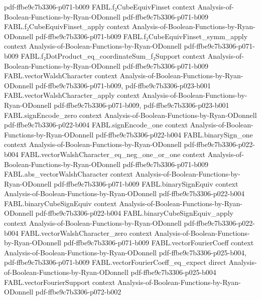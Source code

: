 \begin{theorem}
  {pdf-ffbe9c7b3306-p071-b009}
\proofstep
  {FABL.f₂CubeEquivFinset}
  {context}
  {Analysis-of-Boolean-Functions-by-Ryan-ODonnell}
  {pdf-ffbe9c7b3306-p071-b009}
\proofstep
  {FABL.f₂CubeEquivFinset_apply}
  {context}
  {Analysis-of-Boolean-Functions-by-Ryan-ODonnell}
  {pdf-ffbe9c7b3306-p071-b009}
\proofstep
  {FABL.f₂CubeEquivFinset_symm_apply}
  {context}
  {Analysis-of-Boolean-Functions-by-Ryan-ODonnell}
  {pdf-ffbe9c7b3306-p071-b009}
\proofstep
  {FABL.f₂DotProduct_eq_coordinateSum_f₂Support}
  {context}
  {Analysis-of-Boolean-Functions-by-Ryan-ODonnell}
  {pdf-ffbe9c7b3306-p071-b009}
\proofstep
  {FABL.vectorWalshCharacter}
  {context}
  {Analysis-of-Boolean-Functions-by-Ryan-ODonnell}
  {pdf-ffbe9c7b3306-p071-b009,
    pdf-ffbe9c7b3306-p023-b001}
\proofstep
  {FABL.vectorWalshCharacter_apply}
  {context}
  {Analysis-of-Boolean-Functions-by-Ryan-ODonnell}
  {pdf-ffbe9c7b3306-p071-b009,
    pdf-ffbe9c7b3306-p023-b001}
\proofstep
  {FABL.signEncode_zero}
  {context}
  {Analysis-of-Boolean-Functions-by-Ryan-ODonnell}
  {pdf-ffbe9c7b3306-p022-b004}
\proofstep
  {FABL.signEncode_one}
  {context}
  {Analysis-of-Boolean-Functions-by-Ryan-ODonnell}
  {pdf-ffbe9c7b3306-p022-b004}
\proofstep
  {FABL.binarySign_one}
  {context}
  {Analysis-of-Boolean-Functions-by-Ryan-ODonnell}
  {pdf-ffbe9c7b3306-p022-b004}
\proofstep
  {FABL.vectorWalshCharacter_eq_neg_one_or_one}
  {context}
  {Analysis-of-Boolean-Functions-by-Ryan-ODonnell}
  {pdf-ffbe9c7b3306-p071-b009}
\proofstep
  {FABL.abs_vectorWalshCharacter}
  {context}
  {Analysis-of-Boolean-Functions-by-Ryan-ODonnell}
  {pdf-ffbe9c7b3306-p071-b009}
\proofstep
  {FABL.binarySignEquiv}
  {context}
  {Analysis-of-Boolean-Functions-by-Ryan-ODonnell}
  {pdf-ffbe9c7b3306-p022-b004}
\proofstep
  {FABL.binaryCubeSignEquiv}
  {context}
  {Analysis-of-Boolean-Functions-by-Ryan-ODonnell}
  {pdf-ffbe9c7b3306-p022-b004}
\proofstep
  {FABL.binaryCubeSignEquiv_apply}
  {context}
  {Analysis-of-Boolean-Functions-by-Ryan-ODonnell}
  {pdf-ffbe9c7b3306-p022-b004}
\proofstep
  {FABL.vectorWalshCharacter_zero}
  {context}
  {Analysis-of-Boolean-Functions-by-Ryan-ODonnell}
  {pdf-ffbe9c7b3306-p071-b009}
\proofstep
  {FABL.vectorFourierCoeff}
  {context}
  {Analysis-of-Boolean-Functions-by-Ryan-ODonnell}
  {pdf-ffbe9c7b3306-p025-b004,
    pdf-ffbe9c7b3306-p071-b009}
\proofstep
  {FABL.vectorFourierCoeff_eq_expect}
  {direct}
  {Analysis-of-Boolean-Functions-by-Ryan-ODonnell}
  {pdf-ffbe9c7b3306-p025-b004}
\proofstep
  {FABL.vectorFourierSupport}
  {context}
  {Analysis-of-Boolean-Functions-by-Ryan-ODonnell}
  {pdf-ffbe9c7b3306-p072-b002}

\end{theorem}
